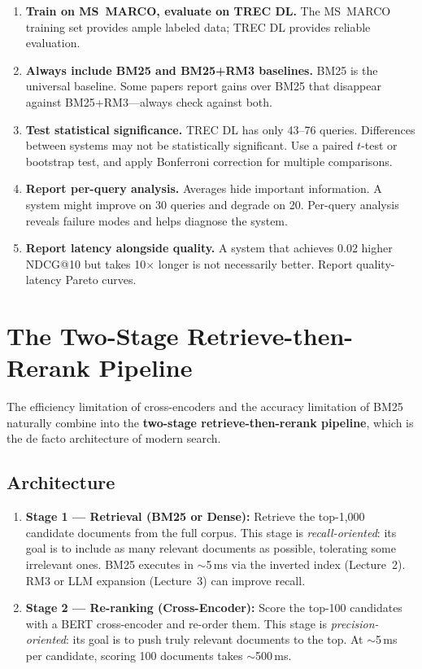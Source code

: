 \documentclass[11pt,a4paper]{article}
\theoremstyle{definition}
\theoremstyle{plain}
\begin{document}
\begin{enumerate}
    \item \textbf{Train on MS~MARCO, evaluate on TREC DL.} The MS~MARCO training set provides ample labeled data; TREC DL provides reliable evaluation.
    
    \item \textbf{Always include BM25 and BM25+RM3 baselines.} BM25 is the universal baseline. Some papers report gains over BM25 that disappear against BM25+RM3---always check against both.
    
    \item \textbf{Test statistical significance.} TREC DL has only 43--76 queries. Differences between systems may not be statistically significant. Use a paired $t$-test or bootstrap test, and apply Bonferroni correction for multiple comparisons.
    
    \item \textbf{Report per-query analysis.} Averages hide important information. A system might improve on 30 queries and degrade on 20. Per-query analysis reveals failure modes and helps diagnose the system.
    
    \item \textbf{Report latency alongside quality.} A system that achieves 0.02 higher NDCG@10 but takes 10$\times$ longer is not necessarily better. Report quality-latency Pareto curves.
\end{enumerate}


\section{The Two-Stage Retrieve-then-Rerank Pipeline}
\label{sec:pipeline}

The efficiency limitation of cross-encoders and the accuracy limitation of BM25 naturally combine into the \textbf{two-stage retrieve-then-rerank pipeline}, which is the de facto architecture of modern search.

\subsection{Architecture}

\begin{enumerate}
    \item \textbf{Stage 1 --- Retrieval (BM25 or Dense):} Retrieve the top-1{,}000 candidate documents from the full corpus. This stage is \emph{recall-oriented}: its goal is to include as many relevant documents as possible, tolerating some irrelevant ones. BM25 executes in $\sim$5\,ms via the inverted index (Lecture~2). RM3 or LLM expansion (Lecture~3) can improve recall.
    
    \item \textbf{Stage 2 --- Re-ranking (Cross-Encoder):} Score the top-100 candidates with a BERT cross-encoder and re-order them. This stage is \emph{precision-oriented}: its goal is to push truly relevant documents to the top. At $\sim$5\,ms per candidate, scoring 100 documents takes $\sim$500\,ms.
\end{enumerate}
\end{document}
